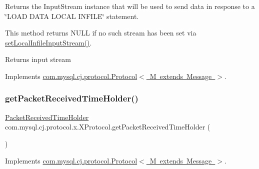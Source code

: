 Returns the Input\+Stream instance that will be used to send data in response to a \char`\"{}\+L\+O\+A\+D D\+A\+T\+A L\+O\+C\+A\+L I\+N\+F\+I\+L\+E\char`\"{} statement.

This method returns N\+U\+LL if no such stream has been set via \mbox{\hyperlink{classcom_1_1mysql_1_1cj_1_1protocol_1_1x_1_1_x_protocol_a4f539adc72747ef03c94bc92acde5efb}{set\+Local\+Infile\+Input\+Stream()}}.

\begin{DoxyReturn}{Returns}
input stream 
\end{DoxyReturn}


Implements \mbox{\hyperlink{interfacecom_1_1mysql_1_1cj_1_1protocol_1_1_protocol_a14849c71b76edabc8dae60d7c22d9fee}{com.\+mysql.\+cj.\+protocol.\+Protocol$<$ M extends Message $>$}}.

\mbox{\label{classcom_1_1mysql_1_1cj_1_1protocol_1_1x_1_1_x_protocol_a67b0b956239ad6b2a4d455c2b62d0050}} 
\subsubsection{\texorpdfstring{get\+Packet\+Received\+Time\+Holder()}{getPacketReceivedTimeHolder()}}
{\footnotesize\ttfamily \mbox{\hyperlink{interfacecom_1_1mysql_1_1cj_1_1protocol_1_1_packet_received_time_holder}{Packet\+Received\+Time\+Holder}} com.\+mysql.\+cj.\+protocol.\+x.\+X\+Protocol.\+get\+Packet\+Received\+Time\+Holder (\begin{DoxyParamCaption}{ }\end{DoxyParamCaption})}



Implements \mbox{\hyperlink{interfacecom_1_1mysql_1_1cj_1_1protocol_1_1_protocol_a68bc036cd22a70fe8947ed43339c4fa0}{com.\+mysql.\+cj.\+protocol.\+Protocol$<$ M extends Message $>$}}.

\mbox{\label{classcom_1_1mysql_1_1cj_1_1protocol_1_1x_1_1_x_protocol_ac97de7fb2df918128b58d1d6c1dcf2fa}} 
